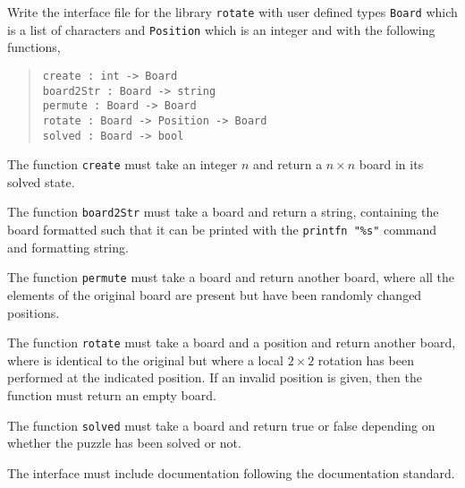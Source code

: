 Write the interface file for the library \lstinline{rotate} with user defined types \lstinline{Board} which is a list of characters and \lstinline{Position} which is an integer and with the following functions,
\begin{quote}
  \lstinline{create : int -> Board}
  \\\lstinline{board2Str : Board -> string}
  \\\lstinline{permute : Board -> Board}
  \\\lstinline{rotate : Board -> Position -> Board}
  \\\lstinline{solved : Board -> bool}
\end{quote}
The function \lstinline{create} must take an integer $n$ and return a $n\times n$ board in its solved state.

The function \lstinline{board2Str} must take a board and return a string, containing the board formatted such that it can be printed with the \lstinline{printfn "%s"} command and formatting string.

  The function \lstinline{permute} must take a board and return another board, where all the elements of the original board are present but have been randomly changed positions.

  The function \lstinline{rotate} must take a board and a position and return another board, where is identical to the original but where a local $2\times 2$ rotation has been performed at the indicated position. If an invalid position is given, then the function must return an empty board.

    The function \lstinline{solved} must take a board and return true or false depending on whether the puzzle has been solved or not.

The interface must include documentation following the documentation standard.
